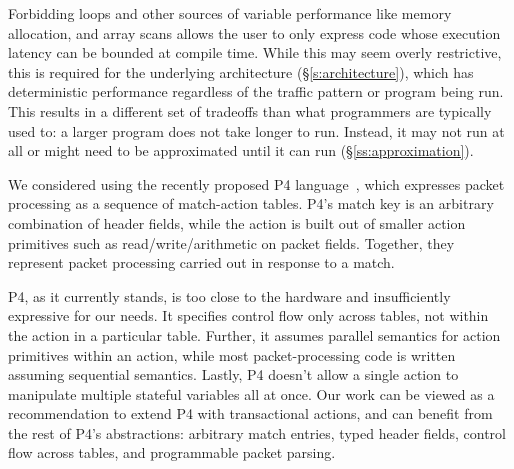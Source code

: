 Forbidding loops and other sources of variable performance like memory
allocation, and array scans allows the user to only express code whose
execution latency can be bounded at compile time.  While this may seem overly
restrictive, this is required for the underlying architecture
(\S\ref{s:architecture}), which has deterministic performance regardless of the
traffic pattern or program being run. This results in a different set of
tradeoffs than what programmers are typically used to: a larger program does
not take longer to run. Instead, it may not run at all or might need to be
approximated until it can run (\S\ref{ss:approximation}).

We considered using the recently proposed P4 language~\cite{p4, dc_p4}, which
expresses packet processing as a sequence of match-action tables. P4's match key
is an arbitrary combination of header fields, while the action is built out of
smaller action primitives such as read/write/arithmetic on packet fields.
Together, they represent packet processing carried out in response to a match.

P4, as it currently stands, is too close to the hardware and insufficiently
expressive for our needs. It specifies control flow only across tables, not
within the action in a particular table. Further, it assumes parallel semantics
for action primitives within an action, while most packet-processing code is
written assuming sequential semantics. Lastly, P4 doesn't allow a single action
to manipulate multiple stateful variables all at once. Our work can be viewed
as a recommendation to extend P4 with transactional actions, and can benefit
from the rest of P4's abstractions: arbitrary match entries, typed header
fields, control flow across tables, and programmable packet parsing.
